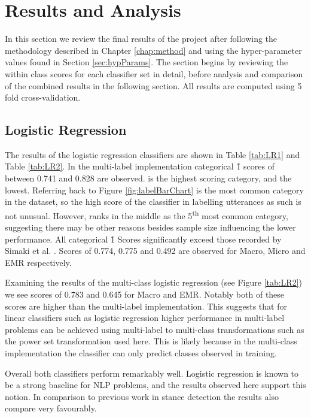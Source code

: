 \documentclass[Dissertation.tex]{subfiles}
\begin{document}
\section{Results and Analysis}
In this section we review the final results of the project after following the methodology described in Chapter \ref{chap:method} and using the hyper-parameter values found in Section \ref{sec:hypParams}. The section begins by reviewing the within class scores for each classifier set in detail, before analysis and comparison of the combined results in the following section. All results are computed using 5 fold cross-validation.

\subsection{Logistic Regression}
The results of the logistic regression classifiers are shown in Table \ref{tab:LR1} and Table \ref{tab:LR2}.
In the multi-label implementation categorical \f{1} scores of between 0.741 and 0.828 are observed.  is the highest scoring category, and  the lowest. Referring back to Figure \ref{fig:labelBarChart}  is the most common category in the dataset, so the high score of the classifier in labelling utterances as such is not unusual. However,  ranks in the middle as the 5\textsuperscript{th} most common category, suggesting there may be other reasons besides sample size influencing the lower performance. All categorical \f{1} Scores significantly exceed those recorded by Simaki et al. \cite{simakiStanceClassificationTexts2017}. Scores of 0.774, 0.775 and 0.492 are observed for \f{Macro}, \f{Micro} and EMR respectively. 

Examining the results of the multi-class logistic regression (see Figure \ref{tab:LR2}) we see scores of 0.783 and 0.645 for \f{Macro} and EMR. Notably both of these scores are higher than the multi-label implementation. This suggests that for linear classifiers such as logistic regression higher performance in multi-label problems can be achieved using multi-label to multi-class transformations such as the power set transformation used here. This is likely because in the multi-class implementation the classifier can only predict classes observed in training. 

Overall both classifiers perform remarkably well. Logistic regression is known to be a strong baseline for NLP problems, and the results observed here support this notion. In comparison to previous work in stance detection the results also compare very favourably.
\end{document}
